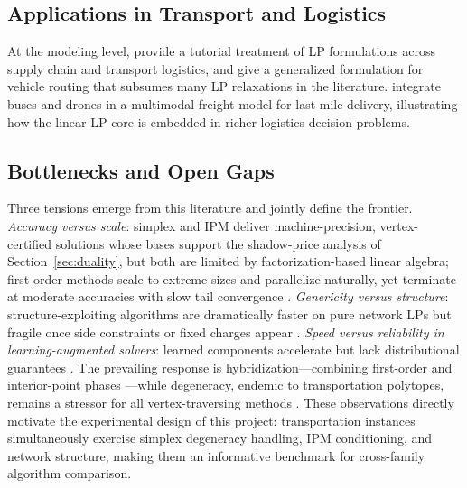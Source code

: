 \subsection{Applications in Transport and Logistics}
\label{sec:rw-applications}

At the modeling level, \citet{bridgelall2022tutorial} provide a tutorial treatment of LP formulations across supply chain and transport logistics, and \citet{munari2016vrp} give a generalized formulation for vehicle routing that subsumes many LP relaxations in the literature. \citet{su2025freight} integrate buses and drones in a multimodal freight model for last-mile delivery, illustrating how the linear LP core is embedded in richer logistics decision problems.

\subsection{Bottlenecks and Open Gaps}
\label{sec:rw-gap}

Three tensions emerge from this literature and jointly define the frontier. \emph{Accuracy versus scale}: simplex and IPM deliver machine-precision, vertex-certified solutions whose bases support the shadow-price analysis of Section~\ref{sec:duality}, but both are limited by factorization-based linear algebra; first-order methods scale to extreme sizes and parallelize naturally, yet terminate at moderate accuracies with slow tail convergence \citep{applegate2025pdlp,lu2025cupdlpx}. \emph{Genericity versus structure}: structure-exploiting algorithms are dramatically faster on pure network LPs but fragile once side constraints or fixed charges appear \citep{holzhauser2016network,saraswathi2026support}. \emph{Speed versus reliability in learning-augmented solvers}: learned components accelerate but lack distributional guarantees \citep{prasad2026tuning,sul2026rl}. The prevailing response is hybridization---combining first-order and interior-point phases \citep{rothberg2026hybrid,lin2018admm}---while degeneracy, endemic to transportation polytopes, remains a stressor for all vertex-traversing methods \citep{im2022degeneracy}. These observations directly motivate the experimental design of this project: transportation instances simultaneously exercise simplex degeneracy handling, IPM conditioning, and network structure, making them an informative benchmark for cross-family algorithm comparison.
